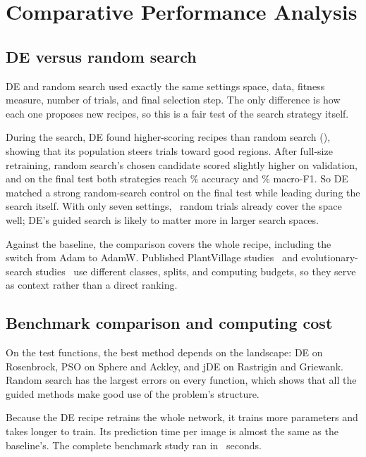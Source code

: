 \chapter{Comparative Performance Analysis}
\section{DE versus random search}
DE and random search used exactly the same settings space, data, fitness measure, number of trials, and final selection step. The only difference is how each one proposes new recipes, so this is a fair test of the search strategy itself.


During the search, DE found higher-scoring recipes than random search (), showing that its population steers trials toward good regions. After full-size retraining, random search's chosen candidate scored slightly higher on validation, and on the final test both strategies reach \DEAcc\% accuracy and \DEFone\% macro-F1. So DE matched a strong random-search control on the final test while leading during the search itself. With only seven settings, \NumEvals\ random trials already cover the space well; DE's guided search is likely to matter more in larger search spaces.

Against the baseline, the comparison covers the whole recipe, including the switch from Adam to AdamW. Published PlantVillage studies~\cite{mohanty2016plant,ferentinos2018plant,too2019plant} and evolutionary-search studies~\cite{real2019evolution,awad2021dehb} use different classes, splits, and computing budgets, so they serve as context rather than a direct ranking.

\section{Benchmark comparison and computing cost}
On the test functions, the best method depends on the landscape: DE on Rosenbrock, PSO on Sphere and Ackley, and jDE on Rastrigin and Griewank. Random search has the largest errors on every function, which shows that all the guided methods make good use of the problem's structure.




Because the DE recipe retrains the whole network, it trains more parameters and takes longer to train. Its prediction time per image is almost the same as the baseline's. The complete benchmark study ran in \BenchmarkSeconds\ seconds.

